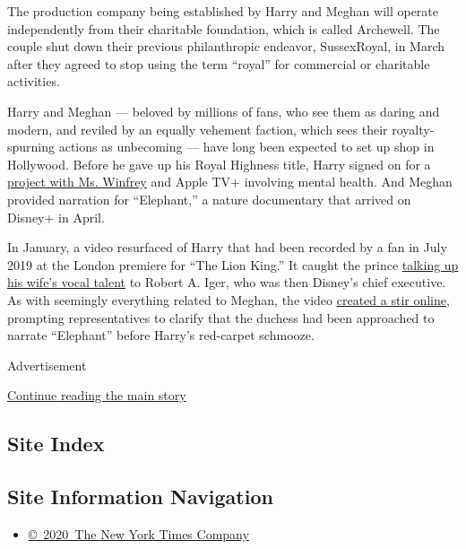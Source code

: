 The production company being established by Harry and Meghan will
operate independently from their charitable foundation, which is called
Archewell. The couple shut down their previous philanthropic endeavor,
SussexRoyal, in March after they agreed to stop using the term ``royal''
for commercial or charitable activities.

Harry and Meghan --- beloved by millions of fans, who see them as daring
and modern, and reviled by an equally vehement faction, which sees their
royalty-spurning actions as unbecoming --- have long been expected to
set up shop in Hollywood. Before he gave up his Royal Highness title,
Harry signed on for a
\href{https://www.hollywoodreporter.com/live-feed/prince-harry-partner-oprah-apple-tv-mental-health-series-1200852}{project
with Ms. Winfrey} and Apple TV+ involving mental health. And Meghan
provided narration for ``Elephant,'' a nature documentary that arrived
on Disney+ in April.

In January, a video resurfaced of Harry that had been recorded by a fan
in July 2019 at the London premiere for ``The Lion King.'' It caught the
prince
\href{https://www.newyorker.com/culture/annals-of-appearances/even-princes-have-to-hustle}{talking
up his wife's vocal talent} to Robert A. Iger, who was then Disney's
chief executive. As with seemingly everything related to Meghan, the
video
\href{https://www.harpersbazaar.com/celebrity/latest/a31965232/prince-harry-meghan-markle-disney-voiceover-pitch/}{created
a stir online}, prompting representatives to clarify that the duchess
had been approached to narrate ``Elephant'' before Harry's red-carpet
schmooze.

Advertisement

\protect\hyperlink{after-bottom}{Continue reading the main story}

\hypertarget{site-index}{%
\subsection{Site Index}\label{site-index}}

\hypertarget{site-information-navigation}{%
\subsection{Site Information
Navigation}\label{site-information-navigation}}

\begin{itemize}
\tightlist
\item
  \href{https://help.nytimes3xbfgragh.onion/hc/en-us/articles/115014792127-Copyright-notice}{©~2020~The
  New York Times Company}
\end{itemize}

